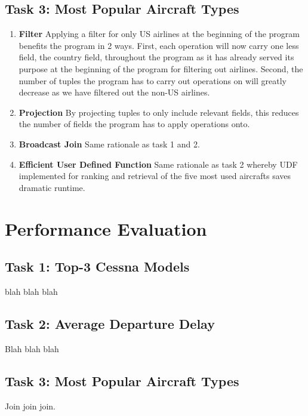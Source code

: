 \documentclass[12pt]{article}
\begin{document}
\subsection*{Task 3: Most Popular Aircraft Types}
\begin{enumerate}
    \item \textbf{Filter} Applying a filter for only US airlines at the beginning of the program benefits the program in 2 ways. First, each operation will now carry one less field, the country field, throughout the program as it has already served its purpose at the beginning of the program for filtering out airlines. Second, the number of tuples the program has to carry out operations on will greatly decrease as we have filtered out the non-US airlines.
    \item \textbf{Projection} By projecting tuples to only include relevant fields, this reduces the number of fields the program has to apply operations onto.
    \item \textbf{Broadcast Join} Same rationale as task 1 and 2.
    \item \textbf{Efficient User Defined Function} Same rationale as task 2 whereby UDF implemented for ranking and retrieval of the five most used aircrafts saves dramatic runtime.
\end{enumerate}

\newpage{}


{}
\section*{Performance Evaluation}
\subsection*{Task 1: Top-3 Cessna Models}
blah blah blah
\subsection*{Task 2: Average Departure Delay}
Blah blah blah 
\subsection*{Task 3: Most Popular Aircraft Types}
Join join join.
\newpage{}
\end{document}

